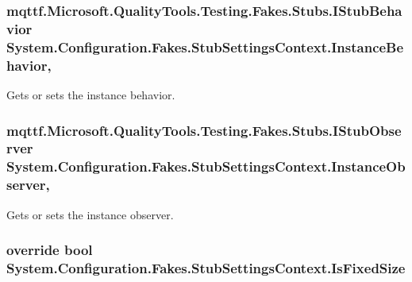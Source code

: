 \hypertarget{class_system_1_1_configuration_1_1_fakes_1_1_stub_settings_context_a4ae71669ef7c72ccc50ad9b20c73e2a5}{
\subsubsection[{Instance\-Behavior}]{\setlength{\rightskip}{0pt plus 5cm}mqttf.\-Microsoft.\-Quality\-Tools.\-Testing.\-Fakes.\-Stubs.\-I\-Stub\-Behavior System.\-Configuration.\-Fakes.\-Stub\-Settings\-Context.\-Instance\-Behavior\hspace{0.3cm}{\ttfamily [get]}, {\ttfamily [set]}}}\label{class_system_1_1_configuration_1_1_fakes_1_1_stub_settings_context_a4ae71669ef7c72ccc50ad9b20c73e2a5}


Gets or sets the instance behavior.

\hypertarget{class_system_1_1_configuration_1_1_fakes_1_1_stub_settings_context_a0789a84fad8674d5e1c06220d91f2f26}{
\subsubsection[{Instance\-Observer}]{\setlength{\rightskip}{0pt plus 5cm}mqttf.\-Microsoft.\-Quality\-Tools.\-Testing.\-Fakes.\-Stubs.\-I\-Stub\-Observer System.\-Configuration.\-Fakes.\-Stub\-Settings\-Context.\-Instance\-Observer\hspace{0.3cm}{\ttfamily [get]}, {\ttfamily [set]}}}\label{class_system_1_1_configuration_1_1_fakes_1_1_stub_settings_context_a0789a84fad8674d5e1c06220d91f2f26}


Gets or sets the instance observer.

\hypertarget{class_system_1_1_configuration_1_1_fakes_1_1_stub_settings_context_ac56c691dba7699f7461a460aabdac6cb}{
\subsubsection[{Is\-Fixed\-Size}]{\setlength{\rightskip}{0pt plus 5cm}override bool System.\-Configuration.\-Fakes.\-Stub\-Settings\-Context.\-Is\-Fixed\-Size\hspace{0.3cm}{\ttfamily [get]}}}\label{class_system_1_1_configuration_1_1_fakes_1_1_stub_settings_context_ac56c691dba7699f7461a460aabdac6cb}


